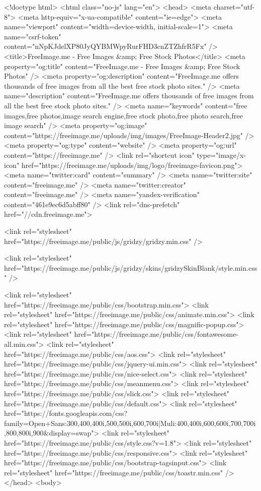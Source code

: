 <!doctype html>
<html class="no-js" lang="en">
<head>
<meta charset="utf-8">
<meta http-equiv="x-ua-compatible" content="ie=edge">
<meta name="viewport" content="width=device-width, initial-scale=1">
<meta name="csrf-token" content="nNpKJdelXP80JyQYBMWpyRurFHD3cnZTZhfrR5Fx" />
<title>FreeImage.me - Free Images &amp; Free Stock Photos</title>
<meta property="og:title" content="FreeImage.me - Free Images &amp; Free Stock Photos" />
<meta property="og:description" content="FreeImage.me offers thousands of free images from all the best free stock photo sites." />
<meta name="description" content="FreeImage.me offers thousands of free images from all the best free stock photo sites." />
<meta name="keywords" content="free images,free photos,image search engine,free stock photo,free photo search,free image search" />
<meta property="og:image" content="https://freeimage.me/uploads/img/images/FreeImage-Header2.jpg" />
<meta property="og:type" content="website" />
<meta property="og:url" content="https://freeimage.me" />
<link rel="shortcut icon" type="image/x-icon" href="https://freeimage.me/uploads/img/logo/freeimage-favicon.png">
<meta name="twitter:card" content="summary" />
<meta name="twitter:site" content="freeimage.me" />
<meta name="twitter:creator" content="freeimage.me" />
<meta name="yandex-verification" content="461e9ec6d5abff80" />
<link rel="dns-prefetch" href="//cdn.freeimage.me">

<link rel="stylesheet" href="https://freeimage.me/public/js/gridzy/gridzy.min.css" />

<link rel="stylesheet" href="https://freeimage.me/public/js/gridzy/skins/gridzySkinBlank/style.min.css" />

<link rel="stylesheet" href="https://freeimage.me/public/css/bootstrap.min.css">
<link rel="stylesheet" href="https://freeimage.me/public/css/animate.min.css">
<link rel="stylesheet" href="https://freeimage.me/public/css/magnific-popup.css">
<link rel="stylesheet" href="https://freeimage.me/public/css/fontawesome-all.min.css">
<link rel="stylesheet" href="https://freeimage.me/public/css/aos.css">
<link rel="stylesheet" href="https://freeimage.me/public/css/jquery-ui.min.css">
<link rel="stylesheet" href="https://freeimage.me/public/css/nice-select.css">
<link rel="stylesheet" href="https://freeimage.me/public/css/meanmenu.css">
<link rel="stylesheet" href="https://freeimage.me/public/css/slick.css">
<link rel="stylesheet" href="https://freeimage.me/public/css/default.css">
<link rel="stylesheet" href="https://fonts.googleapis.com/css?family=Open+Sans:300,400,400i,500,500i,600,700i|Muli:400,400i,600,600i,700,700i,800,800i,900&display=swap">
<link rel="stylesheet" href="https://freeimage.me/public/css/style.css?v=1.8">
<link rel="stylesheet" href="https://freeimage.me/public/css/responsive.css">
<link rel="stylesheet" href="https://freeimage.me/public/css/bootstrap-tagsinput.css">
<link rel="stylesheet" href="https://freeimage.me/public/css/toastr.min.css" />
</head>
<body>


